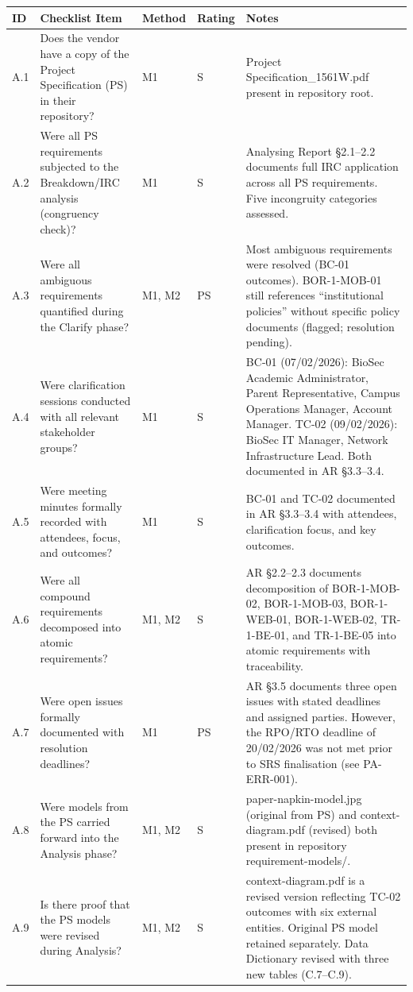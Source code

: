 \documentclass[11pt,a4paper]{article}
\begin{document}
\begin{longtable}{|L{0.8cm}|L{4cm}|L{1.3cm}|L{1.3cm}|L{5.5cm}|}
\hline
{}
\textbf{ID} & \textbf{Checklist Item} & \textbf{Method} & \textbf{Rating} & \textbf{Notes} \\
\hline
\endhead
A.1 & Does the vendor have a copy of the Project Specification (PS) in their repository? & M1 & S & Project Specification\_1561W.pdf present in repository root. \\\hline
A.2 & Were all PS requirements subjected to the Breakdown/IRC analysis (congruency check)? & M1 & S & Analysing Report \S2.1--2.2 documents full IRC application across all PS requirements. Five incongruity categories assessed. \\\hline
A.3 & Were all ambiguous requirements quantified during the Clarify phase? & M1, M2 & PS & Most ambiguous requirements were resolved (BC-01 outcomes). BOR-1-MOB-01 still references ``institutional policies'' without specific policy documents (flagged; resolution pending). \\\hline
A.4 & Were clarification sessions conducted with all relevant stakeholder groups? & M1 & S & BC-01 (07/02/2026): BioSec Academic Administrator, Parent Representative, Campus Operations Manager, Account Manager. TC-02 (09/02/2026): BioSec IT Manager, Network Infrastructure Lead. Both documented in AR \S3.3--3.4. \\\hline
A.5 & Were meeting minutes formally recorded with attendees, focus, and outcomes? & M1 & S & BC-01 and TC-02 documented in AR \S3.3--3.4 with attendees, clarification focus, and key outcomes. \\\hline
A.6 & Were all compound requirements decomposed into atomic requirements? & M1, M2 & S & AR \S2.2--2.3 documents decomposition of BOR-1-MOB-02, BOR-1-MOB-03, BOR-1-WEB-01, BOR-1-WEB-02, TR-1-BE-01, and TR-1-BE-05 into atomic requirements with traceability. \\\hline
A.7 & Were open issues formally documented with resolution deadlines? & M1 & PS & AR \S3.5 documents three open issues with stated deadlines and assigned parties. However, the RPO/RTO deadline of 20/02/2026 was not met prior to SRS finalisation (see PA-ERR-001). \\\hline
A.8 & Were models from the PS carried forward into the Analysis phase? & M1, M2 & S & paper-napkin-model.jpg (original from PS) and context-diagram.pdf (revised) both present in repository requirement-models/. \\\hline
A.9 & Is there proof that the PS models were revised during Analysis? & M1, M2 & S & context-diagram.pdf is a revised version reflecting TC-02 outcomes with six external entities. Original PS model retained separately. Data Dictionary revised with three new tables (C.7--C.9). \\\hline

\end{longtable}
\end{document}
